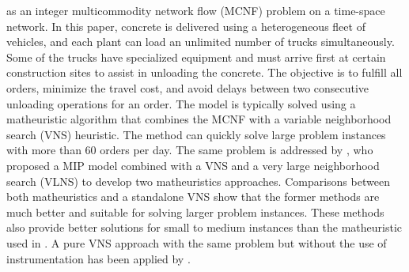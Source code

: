 \documentclass[authoryear,preprint,review,11pt]{elsarticle}
\begin{document}
\cite{schmid2009hybrid} as an integer multicommodity network flow (MCNF) problem on a time-space network. In this paper, concrete is delivered using a heterogeneous fleet of vehicles, and each plant can load an unlimited number of trucks simultaneously. Some of the trucks have specialized equipment and must arrive first at certain construction sites to assist in unloading the concrete. The objective is to fulfill all orders, minimize the travel cost, and avoid delays between two consecutive unloading operations for an order. The model is typically solved using a matheuristic algorithm that combines the MCNF with a variable neighborhood search (VNS) heuristic. The method can quickly solve large problem instances with more than 60 orders per day. The same problem is addressed by \cite{schmid2010hybridization}, who proposed a MIP model combined with a VNS and a very large neighborhood search (VLNS) to develop two matheuristics approaches. Comparisons between both matheuristics and a standalone VNS show that the former methods are much better and suitable for solving larger problem instances. These methods also provide better solutions for small to medium instances than the matheuristic used in \cite{schmid2009hybrid}. A pure VNS approach with the same problem but without the use of instrumentation has been applied by \cite{payr2009optimizing}.
\end{document}
